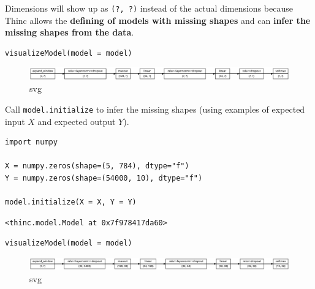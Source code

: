 \documentclass[
]{article}
\begin{document}
Dimensions will show up as \texttt{(?, ?)} instead of the
actual dimensions because Thinc allows the \textbf{defining of models
with missing shapes} and can \textbf{infer the missing shapes from the
data}.

\begin{verbatim}
visualizeModel(model = model)
\end{verbatim}

\begin{figure}
\centering
\includegraphics{05_VisualizingThincModels_files/05_VisualizingThincModels_8_0.svg}
\caption{svg}
\end{figure}

Call \texttt{model.initialize} to infer the missing shapes
(using examples of expected input \(X\) and expected output \(Y\)).

\begin{verbatim}
import numpy

X = numpy.zeros(shape=(5, 784), dtype="f")
Y = numpy.zeros(shape=(54000, 10), dtype="f")

model.initialize(X = X, Y = Y)
\end{verbatim}

\begin{verbatim}
<thinc.model.Model at 0x7f978417da60>
\end{verbatim}

\begin{verbatim}
visualizeModel(model = model)
\end{verbatim}

\begin{figure}
\centering
\includegraphics{05_VisualizingThincModels_files/05_VisualizingThincModels_11_0.svg}
\caption{svg}
\end{figure}
\end{document}
